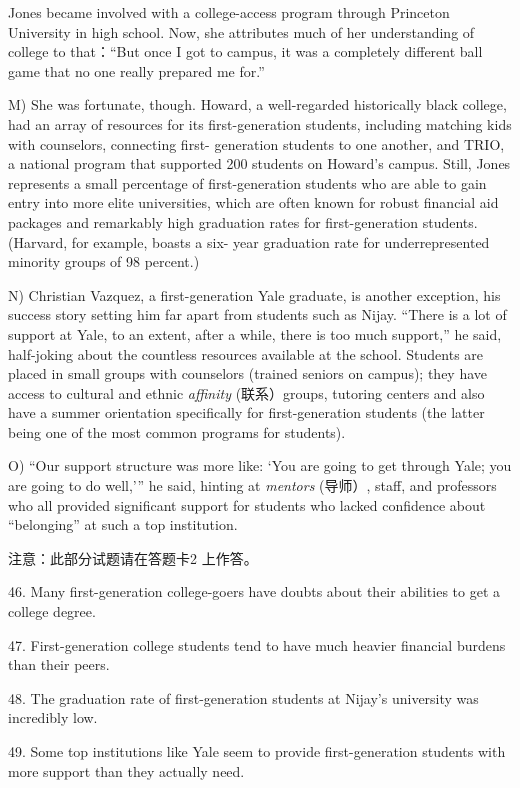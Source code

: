 \documentclass[UTF8,11pt]{ctexart}
\begin{document}
Jones became involved with a college-access program through Princeton University in high school. Now, she attributes much of her understanding of college to that：“But once I got to campus, it was a completely different ball game that no one really prepared me for.”


M) She was fortunate, though. Howard, a well-regarded historically black college, had an array of resources for its first-generation students, including matching kids with counselors, connecting first- generation students to one another, and TRIO, a national program that supported 200 students on Howard’s campus. Still, Jones represents a small percentage of first-generation students who are able to gain entry into more elite universities, which are often known for robust financial aid packages and remarkably high graduation rates for first-generation students. (Harvard, for example, boasts a six- year graduation rate for underrepresented minority groups of 98 percent.)


N) Christian Vazquez, a first-generation Yale graduate, is another exception, his success story setting him far apart from students such as Nijay. “There is a lot of support at Yale, to an extent, after a while, there is too much support,” he said, half-joking about the countless resources available at the school. Students are placed in small groups with counselors (trained seniors on campus); they have access to cultural and ethnic\textit{ affinity} (联系）groups, tutoring centers and also have a summer orientation specifically for first-generation students (the latter being one of the most common programs for students).


O) “Our support structure was more like: ‘You are going to get through Yale; you are going to do well,’” he said, hinting at \textit{mentors} (导师）, staff, and professors who all provided significant support for students who lacked confidence about “belonging” at such a top institution.


注意：此部分试题请在答题卡2 上作答。


46. Many first-generation college-goers have doubts about their abilities to get a college degree.


47. First-generation college students tend to have much heavier financial burdens than their peers.


48. The graduation rate of first-generation students at Nijay’s university was incredibly low.


49. Some top institutions like Yale seem to provide first-generation students with more support than they actually need.
\end{document}

